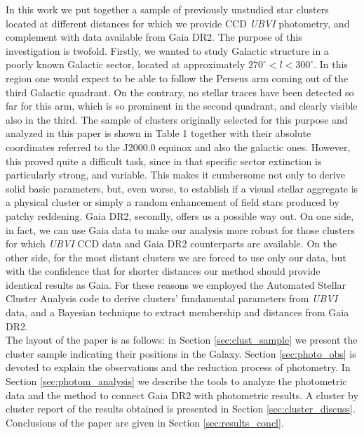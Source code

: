 \documentclass{aa}
\begin{document}
In this work we put together a sample of previously unstudied star clusters
located at different distances for which we provide CCD \textit{UBVI}
photometry, and complement with data available from Gaia DR2. The purpose of
this investigation is twofold. Firstly, we wanted to study Galactic structure in
a poorly known Galactic sector, located at approximately $270^\circ < l <
300^\circ$. In this region one would expect to be able to follow the Perseus arm
coming out of the third Galactic quadrant. On the contrary, no stellar traces
have been detected so far for this arm, which is so prominent in the second
quadrant, and clearly visible also in the third. The sample of clusters
originally selected for this purpose and analyzed in this paper is shown in
Table 1 together with their absolute coordinates referred to the J2000.0 equinox
and also the galactic ones. However, this proved quite a difficult task, since
in that specific sector extinction is particularly strong, and variable. This
makes it cumbersome not only to derive solid basic parameters, but, even worse,
to establish if a visual stellar aggregate is a physical cluster or simply a
random enhancement of field stars produced by patchy reddening.
Gaia DR2, secondly, offers us a possible way out. On one side, in fact, we can
use Gaia data to make our analysis more robust for those clusters for which
\textit{UBVI} CCD data and Gaia DR2 counterparts are available. On the other
side, for the most distant clusters we are forced to use only our data, but with
the confidence that for shorter distances our method should provide identical
results as Gaia. For these reasons we employed the Automated Stellar
Cluster Analysis code \citep[\texttt{ASteCA};][]{Perren_2015} to derive
clusters' fundamental parameters from \textit{UBVI} data, and a Bayesian
technique to extract membership and distances from Gaia DR2.\\

The layout of the paper is as follows: in Section \ref{sec:clust_sample} we
present the cluster sample indicating their positions in the Galaxy.
Section \ref{sec:photo_obs} is devoted to explain the observations and the
reduction process of photometry. In Section \ref{sec:photom_analysis} we
describe the tools to analyze the photometric data and the method to connect
Gaia DR2 with photometric results. A cluster by cluster report of the results
obtained is presented in Section \ref{sec:cluster_discuss}.
Conclusions of the paper are given in Section \ref{sec:results_concl}.
\end{document}
